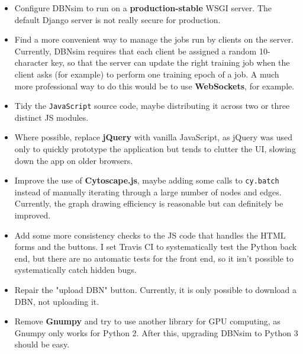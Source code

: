 \documentclass[a4paper]{article}
\begin{document}
	\begin{itemize}
		
			
	\item Configure DBNsim to run on a \textbf{production-stable} WSGI server. The default Django server is not really secure for production.
			
	\item Find a more convenient way to manage the jobs run by clients on the server. Currently, DBNsim requires that each client be assigned a random 10-character key, so that the server can update the right training job when the client asks (for example) to perform one training epoch of a job. A much more professional way to do this would be to use \textbf{WebSockets}, for example.
			
	\item Tidy the \texttt{JavaScript} source code, maybe distributing it across two or three distinct JS modules.
			
	\item Where possible, replace \textbf{jQuery} with vanilla JavaScript, as jQuery was used only to quickly prototype the application but tends to clutter the UI, slowing down the app on older browsers.
			
	\item Improve the use of \textbf{Cytoscape.js}, maybe adding some calls to \texttt{cy.batch} instead of manually iterating through a large number of nodes and edges. Currently, the graph drawing efficiency is reasonable but can definitely be improved.
			
	\item Add some more consistency checks to the JS code that handles the HTML forms and the buttons. I set Travis CI to systematically test the Python back end, but there are no automatic tests for the front end, so it isn't possible to systematically catch hidden bugs.
			
	\item Repair the "upload DBN" button. Currently, it is only possible to download a DBN, not uploading it.
			
	\item Remove \textbf{Gnumpy} and try to use another library for GPU computing, as Gnumpy only works for Python 2. After this, upgrading DBNsim to Python 3 should be easy.
		
	\end{itemize}

	
\end{document}
